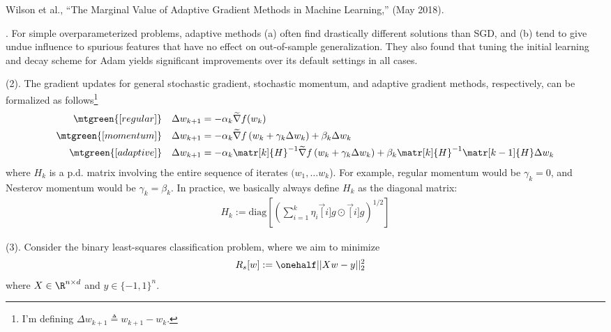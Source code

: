 \documentclass[11pt]{article}
\begin{document}
\vspace{-1em}
{\footnotesize Wilson et al., ``The Marginal Value of Adaptive Gradient Methods in Machine Learning,'' (May 2018).}


\p {}. For simple overparameterized problems, adaptive methods (a) often find drastically different solutions than SGD, and (b) tend to give undue influence to spurious features that have no effect on out-of-sample generalization. They also found that tuning the initial learning and decay scheme for Adam yields significant improvements over its default settings in all cases.

\myspace
\p {} (2). The gradient updates for general stochastic gradient, stochastic momentum, and adaptive gradient methods, respectively, can be formalized as follows\footnote{I'm defining $\Delta w_{k + 1} \triangleq w_{k + 1} - w_k$.}
\begin{align}
\mtgreen{[regular]} 	\quad	\Delta w_{k + 1} 
&= - \alpha_k \widetilde{\nabla} f(w_k) \\
\mtgreen{[momentum]} \quad	\Delta w_{k + 1} 
&= - \alpha_k \widetilde{\nabla} f\left( w_k + \gamma_k   \Delta w_k    \right)
+ \beta_k \Delta w_k \\
\mtgreen{[adaptive]} \quad \Delta w_{k + 1}
&= - \alpha_k \matr[k]{H}^{-1} \widetilde{\nabla} f\left( w_k + \gamma_k  \Delta w_k    \right)
+ \beta_k \matr[k]{H}^{-1}  \matr[k - 1]{H} \Delta w_k
\end{align}
where $H_k$ is a p.d. matrix involving the entire sequence of iterates $(w_1, \ldots w_k$). For example, regular momentum would be $\gamma_k{=}0$, and Nesterov momentum would be $\gamma_k{=}\beta_k$. In practice, we basically always define $H_k$ as the diagonal matrix:
\begin{align}
H_k := \text{diag}  \left[
\left(
\sum_{i=1}^k \eta_i \vec[i]{g} \odot  \vec[i]{g}
\right)^{1/2}
\right]
\end{align}

\myspace
\p {} (3). Consider the binary least-squares classification problem, where we aim to minimize
\begin{align}
R_s[w] &:= \onehalf ||Xw - y||_2^2
\end{align}
where $X \in \R^{n \times d}$ and $y \in \{-1, 1\}^{n}$. 
\end{document}
